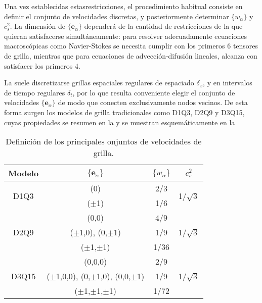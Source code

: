 Una vez establecidas estasrestricciones, el procedimiento habitual consiste en definir el conjunto de velocidades discretas, y posteriormente determinar $\{w_{\alpha}\}$ y $c_s^2$. La dimensi\'on de $\{ \bm{e}_{\alpha}\}$ depender\'a de la cantidad de restricciones de la  que quieran satisfacerse simult\'aneamente: para resolver adecuadamente ecuaciones macrosc\'opicas como Navier-Stokes se necesita cumplir con los primeros 6 tensores de grilla, mientras que para ecuaciones de advecci\'on-difusi\'on lineales, alcanza con satisfacer los primeros 4.
\par
La  suele discretizarse grillas espaciales regulares de espaciado $\delta_x$, y en intervalos de tiempo regulares $\delta_t$, por lo que resulta conveniente elegir el conjunto de velocidades $\{ \bm{e}_{\alpha} \}$ de modo que conecten exclusivamente nodos vecinos. De esta forma surgen los modelos de grilla tradicionales como D1Q3, D2Q9 y D3Q15, cuyas propiedades se resumen en la  y se muestran esquem\'aticamente en la 

\begin{table}[ht]
	\centering
    \begin{tabular}{c c c c}
	    \toprule
        \bf Modelo & $\{\bm{e}_{\alpha}\}$ & $\{w_{\alpha}\}$ & $c_s^2$ \\
        \midrule
        \multirow{2}{*}{D1Q3} & (0)      & 2/3 & \multirow{2}{*}{1/$\sqrt{3}$} \\
                              & ($\pm$1) & 1/6 &  \\                 
        \midrule
        \multirow{3}{*}{D2Q9} & (0,0) & 4/9 & \multirow{3}{*}{1/$\sqrt{3}$} \\
                              & ($\pm$1,0), (0,$\pm$1) & 1/9 &  \\
                              & ($\pm$1,$\pm$1) & 1/36 &  \\                              
        \midrule
        \multirow{3}{*}{D3Q15} & (0,0,0) & 2/9 & \multirow{3}{*}{1/$\sqrt{3}$} \\
                               & ($\pm$1,0,0), (0,$\pm$1,0), (0,0,$\pm$1) & 1/9 &  \\
                               & ($\pm$1,$\pm$1,$\pm$1) & 1/72 &  \\         
        \bottomrule
	\end{tabular}
	\caption{Definici\'on de los principales onjuntos de velocidades de grilla.}
	\label{tab:DdQq}
\end{table}  

